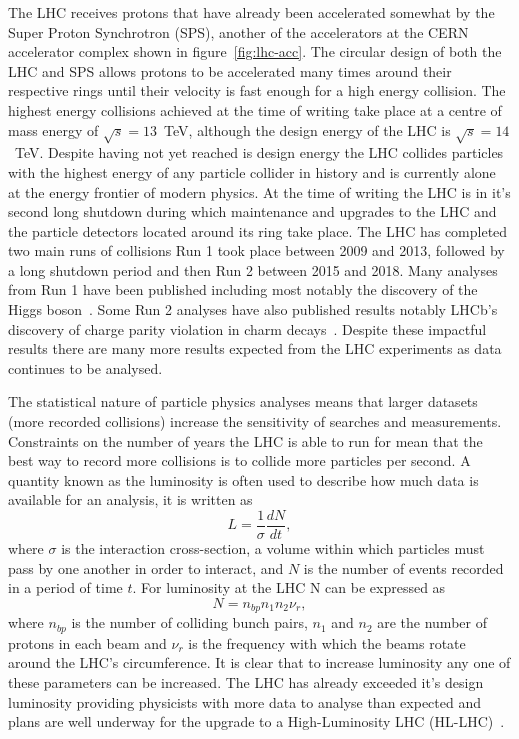 The LHC receives protons that have already been accelerated somewhat by the
Super Proton Synchrotron (SPS), another of the accelerators at the CERN
accelerator complex shown in figure~\ref{fig:lhc-acc}. The circular design of
both the LHC and SPS allows protons to be accelerated many times around their
respective rings until their velocity is fast enough for a high energy
collision. The highest energy collisions achieved at the time of writing take
place at a centre of mass energy of $\sqrt{s} = 13 $~TeV, although the design
energy of the LHC is $\sqrt{s} = 14 $~TeV. Despite having not yet reached is
design energy the LHC collides particles with the highest energy of any particle
collider in history and is currently alone at the energy frontier of modern
physics. At the time of writing the LHC is in it's second long shutdown during
which maintenance and upgrades to the LHC and the particle detectors located
around its ring take place. The LHC has completed two main runs of collisions
Run 1 took place between 2009 and 2013, followed  by a long shutdown period and
then Run 2 between 2015 and 2018. Many analyses from Run 1 have been published
including most notably the discovery of the Higgs boson~\cite{DiscoHiggsATLAS,
  DiscoHiggsCMS}. Some Run 2 analyses have also published results notably LHCb's
discovery of charge parity violation in charm decays~\cite{cp-charm}. Despite
these impactful results there are many more results expected from the LHC
experiments as data continues to be analysed.

The statistical nature of particle physics analyses means that larger datasets
(more recorded collisions) increase the sensitivity of searches and
measurements. Constraints on the number of years the LHC is able to run for mean
that the best way to record more collisions is to collide more particles per
second. A quantity known as the luminosity is often used to describe how much
data is available for an analysis, it is written as
\begin{equation}
  \label{eq:luminosity}
  L = \frac{1}{\sigma}\frac{dN}{dt},
\end{equation}
where $\sigma$ is the interaction cross-section, a volume within which particles
must pass by one another in order to interact, and $N$ is the number of events
recorded in a period of time $t$. For luminosity at the LHC N can be expressed as
\begin{equation}
  \label{eq:lhc-lumi}
  N = n_{bp}n_{1}n_{2}\nu_{r},
\end{equation}
where $n_{bp}$ is the number of colliding bunch pairs, $n_{1}$ and $n_{2}$ are
the number of protons in each beam and $\nu_r$ is the frequency with which the
beams rotate around the LHC's circumference. It is clear that to increase
luminosity any one of these parameters can be increased. The LHC has already
exceeded it's design luminosity providing physicists with more data to analyse
than expected and plans are well underway for the upgrade to a High-Luminosity
LHC (HL-LHC)~\cite{hilumi-tdr}.

